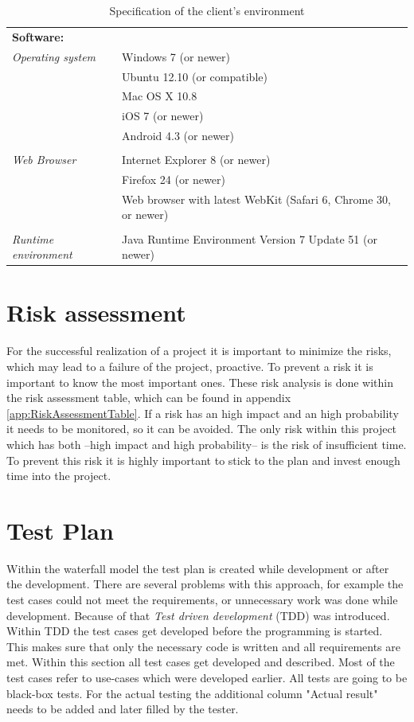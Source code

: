 \documentclass[11pt,a4paper]{report}
\begin{document}
\begin{table}[h!]
    \begin{tabularx}{\textwidth}{l | X}
        \textbf{Software:} & \\
        \emph{Operating system} & Windows 7 (or newer)\\
        & Ubuntu 12.10 (or compatible) \\
        & Mac OS X 10.8 \\
        & iOS 7 (or newer) \\
        & Android 4.3 (or newer)\\
        \\
        \emph{Web Browser} & Internet Explorer 8 (or newer)\\
        & Firefox 24 (or newer)\\
        & Web browser with latest WebKit (Safari 6, Chrome 30, or newer)\\
        \\
        \emph{Runtime environment} & Java Runtime Environment Version 7 Update 51 (or newer)\\
    \end{tabularx}
\caption{Specification of the client's environment}
\label{tab:clientEnv}
\end{table}

\pagebreak
\section{Risk assessment}
For the successful realization of a project it is important to minimize the risks, which may lead to a failure of the project, proactive. To prevent a risk it is important to know the most important ones. These risk analysis is done within the risk assessment table, which can be found in appendix \vref{app:RiskAssessmentTable}. If a risk has an high impact and an high probability it needs to be monitored, so it can be avoided. The only risk within this project which has both --high impact and high probability-- is the risk of insufficient time. To prevent this risk it is highly important to stick to the plan and invest enough time into the project.

\section{Test Plan}
Within the waterfall model the test plan is created while development or after the development. There are several problems with this approach, for example the test cases could not meet the requirements, or unnecessary work was done while development. Because of that \emph{Test driven development} (TDD) was introduced. Within TDD the test cases get developed before the programming is started. This makes sure that only the necessary code is written and all requirements are met. Within this section all test cases get developed and described. Most of the test cases refer to use-cases which were developed earlier. All tests are going to be black-box tests. For the actual testing the additional column "Actual result" needs to be added and later filled by the tester.
\pagebreak
\end{document}
